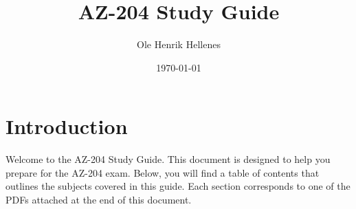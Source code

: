 \documentclass{article}
\title{AZ-204 Study Guide}
\author{Ole Henrik Hellenes}
\date{\today}
\begin{document}
\maketitle

\section*{Introduction}
Welcome to the AZ-204 Study Guide. This document is designed to help you prepare for the AZ-204 exam. Below, you will find a table of contents that outlines the subjects covered in this guide. Each section corresponds to one of the PDFs attached at the end of this document.

\newpage

\tableofcontents

\newpage
\end{document}
